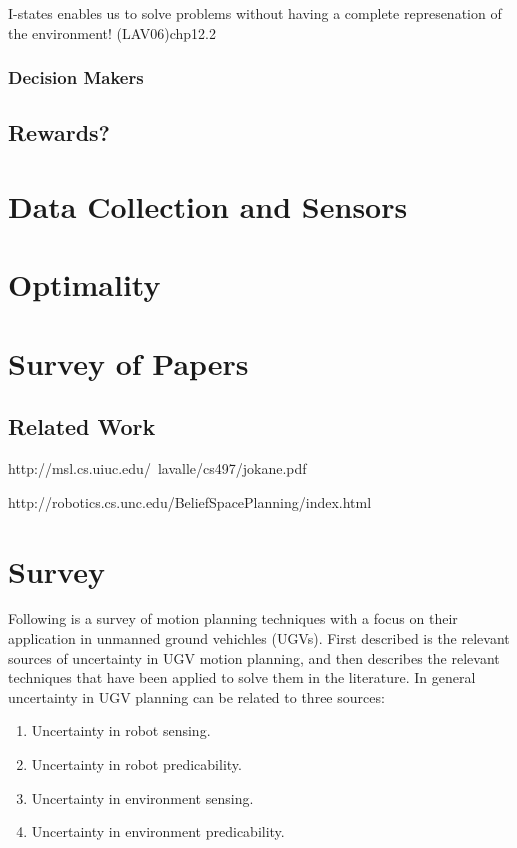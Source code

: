 I-states enables us to solve problems without having a complete represenation of
the environment! (LAV06)chp12.2



\subsubsection{Decision Makers}

\subsection{Rewards?}

\section{Data Collection and Sensors}



\section{Optimality}



\section{Survey of Papers}

\subsection{Related Work}

http://msl.cs.uiuc.edu/~lavalle/cs497/jokane.pdf

http://robotics.cs.unc.edu/BeliefSpacePlanning/index.html

\section{Survey}

Following is a survey of motion planning techniques with a focus on their
application in unmanned ground vehichles (UGVs). First described is the relevant
sources of uncertainty in UGV motion planning, and then describes the relevant
techniques that have been applied to solve them in the literature. In general
uncertainty in UGV planning can be related to three sources:
\begin{enumerate}
\item Uncertainty in robot sensing.
\item Uncertainty in robot predicability.
\item Uncertainty in environment sensing.
\item Uncertainty in environment predicability.
\end{enumerate}
\cite{lavalle_framework_1995}

